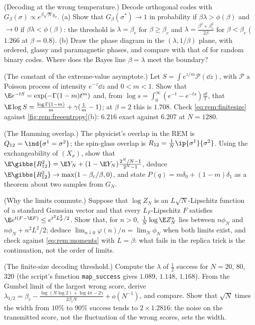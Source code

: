 \begin{refsection}
\begin{exercises}
\item \byhand (Decoding at the wrong temperature.) Decode orthogonal codes with $G_\beta(\sigma)\propto e^{\beta\sqrt Ny_\sigma}$. (a) Show that $G_\beta(\sigma^*)\to1$ in probability if $\beta\lambda>\phi(\beta)$ and $\to0$ if $\beta\lambda<\phi(\beta)$: the threshold is $\lambda=\beta_c$ for $\beta\ge\beta_c$ and $\lambda=\frac{\beta^2+\beta_c^2}{2\beta}$ for $\beta<\beta_c$ ($1.266$ at $\beta=0.8$). (b) Draw the phase diagram in the $(\lambda,1/\beta)$ plane, with ordered, glassy and paramagnetic phases, and compare with that of \textcite[ch.~6]{MezardMontanari2009} for random binary codes. Where does the Bayes line $\beta=\lambda$ meet the boundary?\label{ex:rem:mismatch}

\item \byhand (The constant of the extreme-value asymptote.) Let $S=\int e^{z/m}\mathcal P(\dd z)$, with $\mathcal P$ a Poisson process of intensity $e^{-z}\dd z$ and $0<m<1$. Show that $\E e^{-tS}=\exp(-\Gamma(1-m)t^m)$ and, from $\log s=\int_0^\infty(e^{-t}-e^{-ts})\frac{\dd t}t$, that $\E\log S=\frac{\log\Gamma(1-m)}m+\gamma(\frac1m-1)$; at $\beta=2$ this is $1.708$. Check \eqref{eq:rem:finitesize} against \cref{fig:rem:freeentropy}(b): $6.216$ exact against $6.207$ at $N=1280$.\label{ex:rem:constant}

\item \translate (The Hamming overlap.) The physicist's overlap in the REM is $Q_{12}=\ind\{\sigma^1=\sigma^2\}$; the spin-glass overlap is $R_{12}=\frac1N\ip{\sigma^1}{\sigma^2}$. Using the exchangeability of $(X_\sigma)$, show that $\E\gibbs{R_{12}^2}=\E Y_N+(1-\E Y_N)\frac{2^N/N-1}{2^N-1}$, deduce $\E\gibbs{R_{12}^2}\to\max(1-\beta_c/\beta,0)$, and state $P(q)=m\delta_0+(1-m)\delta_1$ as a theorem about two samples from $G_N$.\label{ex:rem:hamming}

\item \translate (Why the limits commute.) Suppose that $\log Z_N$ is an $L\sqrt N$-Lipschitz function of a standard Gaussian vector and that every $L_F$-Lipschitz $F$ satisfies $\E e^{t(F-\E F)}\le e^{t^2L_F^2/2}$. Show that, for $n>0$, $\frac1N\log\E Z_N^n$ lies between $n\phi_N$ and $n\phi_N+n^2L^2/2$; deduce $\lim_{n\downarrow0}\varphi(n)/n=\lim_N\phi_N$ when both limits exist, and check against \eqref{eq:rem:moments} with $L=\beta$: what fails in the replica trick is the continuation, not the order of limits.\label{ex:rem:commute}

\item \measurement (The finite-size decoding threshold.) Compute the $\lambda$ of $\frac12$ success for $N=20$, $80$, $320$ (the script's function \texttt{map\_success} gives $1.089$, $1.148$, $1.168$). From the Gumbel limit of the largest wrong score, derive $\lambda_{1/2}=\beta_c-\frac{\log(N\log2)+\log4\pi-2\gamma}{2\beta_cN}+o(N^{-1})$, and compare. Show that $\sqrt N$ times the width from $10\%$ to $90\%$ success tends to $2\times1.2816$: the noise on the transmitted score, not the fluctuation of the wrong scores, sets the width.\label{ex:rem:threshold}


\end{exercises}
\end{refsection}
